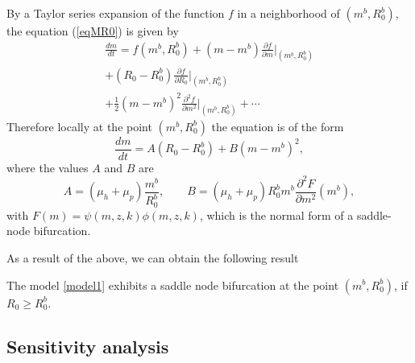 \documentclass[eng]{MMSB-class-eng}
\begin{document}
{By a Taylor series expansion of the function $f$ in a neighborhood of $(m^b,R_0^b)$, the equation (\ref{eqMR0}) is given by
\begin{multline}
	\frac{dm}{dt}=f(m^b,R_0^b)+(m-m^b)\frac{\partial f }{\partial m}\big\vert_{(m^b,R_0^b)}\\ 
	+(R_0-R_0^b){\frac{\partial f }{\partial R_0}\big\vert_{(m^b,R_0^b)}}\\%
+{\frac {1}{2}}(m-m^b)^2{\frac{\partial^2 f }{\partial m^2}}\big\vert_{(m^b,R_0^b)}%
	+\cdots 
\end{multline}
Therefore locally at the point $(m^b,R_0^b)$ the equation is of the form
\begin{equation}
\dfrac{dm}{dt}=A(R_0- R_0^b)+B(m- m^b)^2,
\end{equation}
where the values $A$ and $B$ are
\begin{equation}
A=(\mu_h +\mu_p)\frac{ m^b}{ R_0^b}, \qquad  B=(\mu_h + \mu_p) R_0^b  m^b \frac{\partial^2 F}{\partial m^2}( m^b),
\end{equation}
with $F(m)= \psi(m,z,k)\phi(m,z, k)$,
which is the normal form of a saddle-node bifurcation.

{\color{blue}
As a result of the above, we can obtain the following result
\begin{theorem}
	The model \eqref{model1} exhibits a saddle node bifurcation at the point $(m^b,R_0^b)$, if $R_0 \geq R_0^b$.
\end{theorem}
}

}


\subsection{Sensitivity analysis}
	
\end{document}
